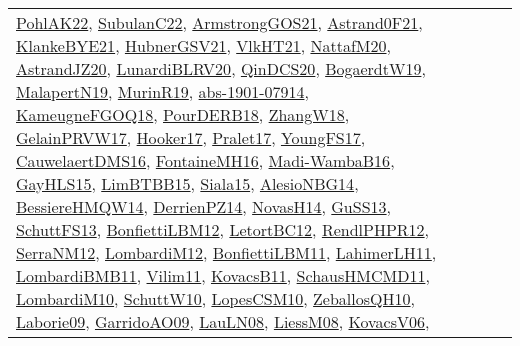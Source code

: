 {\begin{longtable}{llp{6cm}p{6cm}p{6cm}}
\href{articles/PohlAK22.pdf}{PohlAK22}\cite{PohlAK22}, \href{articles/SubulanC22.pdf}{SubulanC22}\cite{SubulanC22}, \href{papers/ArmstrongGOS21.pdf}{ArmstrongGOS21}\cite{ArmstrongGOS21}, \href{papers/Astrand0F21.pdf}{Astrand0F21}\cite{Astrand0F21}, \href{papers/KlankeBYE21.pdf}{KlankeBYE21}\cite{KlankeBYE21}, \href{articles/HubnerGSV21.pdf}{HubnerGSV21}\cite{HubnerGSV21}, \href{articles/VlkHT21.pdf}{VlkHT21}\cite{VlkHT21}, \href{papers/NattafM20.pdf}{NattafM20}\cite{NattafM20}, \href{articles/AstrandJZ20.pdf}{AstrandJZ20}\cite{AstrandJZ20}, \href{articles/LunardiBLRV20.pdf}{LunardiBLRV20}\cite{LunardiBLRV20}, \href{articles/QinDCS20.pdf}{QinDCS20}\cite{QinDCS20}, \href{papers/BogaerdtW19.pdf}{BogaerdtW19}\cite{BogaerdtW19}, \href{papers/MalapertN19.pdf}{MalapertN19}\cite{MalapertN19}, \href{papers/MurinR19.pdf}{MurinR19}\cite{MurinR19}, \href{articles/abs-1901-07914.pdf}{abs-1901-07914}\cite{abs-1901-07914}, \href{papers/KameugneFGOQ18.pdf}{KameugneFGOQ18}\cite{KameugneFGOQ18}, \href{articles/PourDERB18.pdf}{PourDERB18}\cite{PourDERB18}, \href{articles/ZhangW18.pdf}{ZhangW18}\cite{ZhangW18}, \href{papers/GelainPRVW17.pdf}{GelainPRVW17}\cite{GelainPRVW17}, \href{papers/Hooker17.pdf}{Hooker17}\cite{Hooker17}, \href{papers/Pralet17.pdf}{Pralet17}\cite{Pralet17}, \href{papers/YoungFS17.pdf}{YoungFS17}\cite{YoungFS17}, \href{papers/CauwelaertDMS16.pdf}{CauwelaertDMS16}\cite{CauwelaertDMS16}, \href{papers/FontaineMH16.pdf}{FontaineMH16}\cite{FontaineMH16}, \href{papers/Madi-WambaB16.pdf}{Madi-WambaB16}\cite{Madi-WambaB16}, \href{papers/GayHLS15.pdf}{GayHLS15}\cite{GayHLS15}, \href{papers/LimBTBB15.pdf}{LimBTBB15}\cite{LimBTBB15}, \href{articles/Siala15.pdf}{Siala15}\cite{Siala15}, \href{papers/AlesioNBG14.pdf}{AlesioNBG14}\cite{AlesioNBG14}, \href{papers/BessiereHMQW14.pdf}{BessiereHMQW14}\cite{BessiereHMQW14}, \href{papers/DerrienPZ14.pdf}{DerrienPZ14}\cite{DerrienPZ14}, \href{articles/NovasH14.pdf}{NovasH14}\cite{NovasH14}, \href{papers/GuSS13.pdf}{GuSS13}\cite{GuSS13}, \href{papers/SchuttFS13.pdf}{SchuttFS13}\cite{SchuttFS13}, \href{papers/BonfiettiLBM12.pdf}{BonfiettiLBM12}\cite{BonfiettiLBM12}, \href{papers/LetortBC12.pdf}{LetortBC12}\cite{LetortBC12}, \href{papers/RendlPHPR12.pdf}{RendlPHPR12}\cite{RendlPHPR12}, \href{papers/SerraNM12.pdf}{SerraNM12}\cite{SerraNM12}, \href{articles/LombardiM12.pdf}{LombardiM12}\cite{LombardiM12}, \href{papers/BonfiettiLBM11.pdf}{BonfiettiLBM11}\cite{BonfiettiLBM11}, \href{papers/LahimerLH11.pdf}{LahimerLH11}\cite{LahimerLH11}, \href{papers/LombardiBMB11.pdf}{LombardiBMB11}\cite{LombardiBMB11}, \href{papers/Vilim11.pdf}{Vilim11}\cite{Vilim11}, \href{articles/KovacsB11.pdf}{KovacsB11}\cite{KovacsB11}, \href{articles/SchausHMCMD11.pdf}{SchausHMCMD11}\cite{SchausHMCMD11}, \href{papers/LombardiM10.pdf}{LombardiM10}\cite{LombardiM10}, \href{papers/SchuttW10.pdf}{SchuttW10}\cite{SchuttW10}, \href{articles/LopesCSM10.pdf}{LopesCSM10}\cite{LopesCSM10}, \href{articles/ZeballosQH10.pdf}{ZeballosQH10}\cite{ZeballosQH10}, \href{papers/Laborie09.pdf}{Laborie09}\cite{Laborie09}, \href{articles/GarridoAO09.pdf}{GarridoAO09}\cite{GarridoAO09}, \href{papers/LauLN08.pdf}{LauLN08}\cite{LauLN08}, \href{articles/LiessM08.pdf}{LiessM08}\cite{LiessM08}, \href{papers/KovacsV06.pdf}{KovacsV06}\cite{KovacsV06}, 
\end{longtable}}
